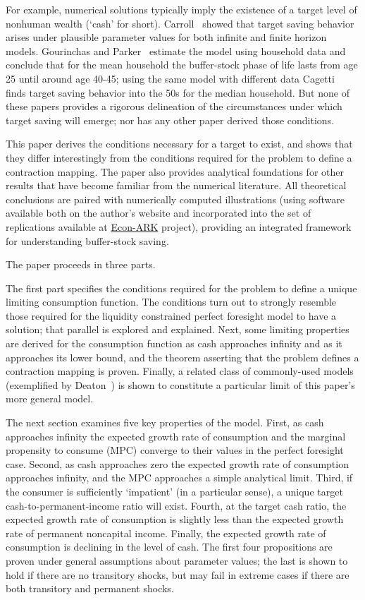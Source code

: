 \documentclass[titlepage]{\econtex}\providecommand{\texname}{BufferStockTheory}%
\begin{document}
For example, numerical solutions typically imply the existence of a target level of nonhuman wealth (`cash' for short).  Carroll~\citeyearpar{carroll:brookings,carroll:bslcpih} showed that target saving behavior arises under plausible parameter values for both infinite and finite horizon models.  Gourinchas and Parker~\citeyearpar{gpLifeCycle} estimate the model using household data and conclude that for the mean household the buffer-stock phase of life lasts from age 25 until around age 40-45; using the same model with different data Cagetti~\citeyearpar{cagettiWprofiles} finds target saving behavior into the 50s for the median household.  But none of these papers provides a rigorous delineation of the circumstances under which target saving will emerge; nor has any other paper derived those conditions.

This paper derives the conditions necessary for a target to exist, and shows that they differ interestingly from the conditions required for the problem to define a contraction mapping.  The paper also provides analytical foundations for other results that have become familiar from the numerical literature.  All theoretical conclusions are paired with numerically computed illustrations (using software available both on the author's website and incorporated into the set of replications available at \href{http://econ-ark.org}{Econ-ARK} project), providing an integrated framework for understanding buffer-stock saving.

The paper proceeds in three parts.

The first part specifies the conditions required for the problem to
define a unique limiting consumption function.  The conditions turn
out to strongly resemble those required for the liquidity constrained
perfect foresight model to have a solution; that parallel is explored and
explained.  Next, some limiting properties are derived for the
consumption function as cash approaches infinity and as it approaches
its lower bound, and the theorem asserting that the problem defines a
contraction mapping is proven.  Finally, a related class of commonly-used models
(exemplified by Deaton~\citeyearpar{deatonLiqConstr}) is shown to
constitute a particular limit of this paper's more general model.

The next section examines five key properties of the model. First, as
cash approaches infinity the expected growth rate of consumption and
the marginal propensity to consume (MPC) converge to their values in
the perfect foresight case. Second, as cash approaches zero the
expected growth rate of consumption approaches infinity, and the MPC
approaches a simple analytical limit.  Third, if the consumer is
sufficiently `impatient' (in a particular sense), a unique target
cash-to-permanent-income ratio will exist.  Fourth, at the target cash
ratio, the expected growth rate of consumption is slightly less than
the expected growth rate of permanent noncapital income.  Finally, the
expected growth rate of consumption is declining in the level of
cash. The first four propositions are proven under general assumptions
about parameter values; the last is shown to hold if there are no
transitory shocks, but may fail in extreme cases if there are both
transitory and permanent shocks.
\end{document}
